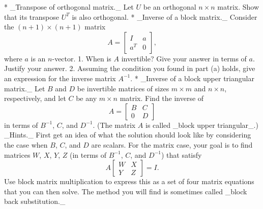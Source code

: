 * _Transpose of orthogonal matrix._ Let \(U\) be an orthogonal \(n\times n\) matrix. Show that its transpose \(U^{T}\) is also orthogonal.
* _Inverse of a block matrix._ Consider the \((n+1)\times(n+1)\) matrix \[A=\left[\begin{array}{cc}I&a\\ a^{T}&0\end{array}\right],\] where \(a\) is an \(n\)-vector. 1. When is \(A\) invertible? Give your answer in terms of \(a\). Justify your answer. 2. Assuming the condition you found in part (a) holds, give an expression for the inverse matrix \(A^{-1}\).
* _Inverse of a block upper triangular matrix._ Let \(B\) and \(D\) be invertible matrices of sizes \(m\times m\) and \(n\times n\), respectively, and let \(C\) be any \(m\times n\) matrix. Find the inverse of \[A=\left[\begin{array}{cc}B&C\\ 0&D\end{array}\right]\] in terms of \(B^{-1}\), \(C\), and \(D^{-1}\). (The matrix \(A\) is called _block upper triangular_.) _Hints._ First get an idea of what the solution should look like by considering the case when \(B\), \(C\), and \(D\) are scalars. For the matrix case, your goal is to find matrices \(W\), \(X\), \(Y\), \(Z\) (in terms of \(B^{-1}\), \(C\), and \(D^{-1}\)) that satisfy \[A\left[\begin{array}{cc}W&X\\ Y&Z\end{array}\right]=I.\] Use block matrix multiplication to express this as a set of four matrix equations that you can then solve. The method you will find is sometimes called _block back substitution._